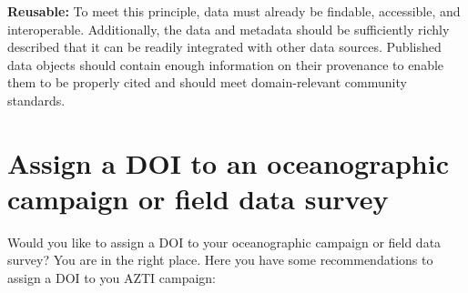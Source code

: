 \documentclass[
]{book}
\begin{document}
\textbf{Reusable:} To meet this principle, data must already be findable, accessible, and interoperable. Additionally, the data and metadata should be sufficiently richly described that it can be readily integrated with other data sources. Published data objects should contain enough information on their provenance to enable them to be properly cited and should meet domain-relevant community standards.

\hypertarget{assign-a-doi-to-an-oceanographic-campaign-or-field-data-survey}{%
\chapter{Assign a DOI to an oceanographic campaign or field data survey}\label{assign-a-doi-to-an-oceanographic-campaign-or-field-data-survey}}

Would you like to assign a DOI to your oceanographic campaign or field data survey? You are in the right place. Here you have some recommendations to assign a DOI to you AZTI campaign:
\end{document}
